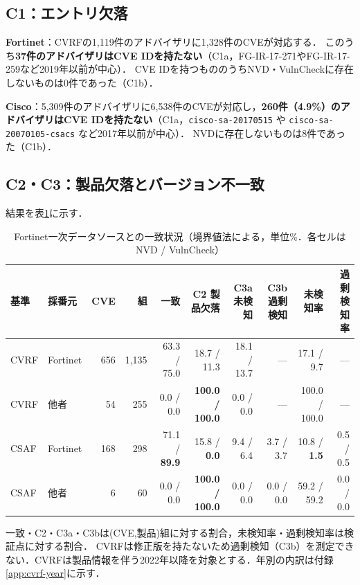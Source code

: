 \subsection{C1：エントリ欠落}

\textbf{Fortinet}：CVRFの1,119件のアドバイザリに1,328件のCVEが対応する．
このうち\textbf{37件のアドバイザリはCVE IDを持たない}（C1a，FG-IR-17-271やFG-IR-17-259など2019年以前が中心）．
CVE IDを持つもののうちNVD・VulnCheckに存在しないものは0件であった（C1b）．

\textbf{Cisco}：5,309件のアドバイザリに6,538件のCVEが対応し，\textbf{260件（4.9\%）のアドバイザリはCVE IDを持たない}（C1a，\texttt{cisco-sa-20170515} や \texttt{cisco-sa-20070105-csacs} など2017年以前が中心）．
NVDに存在しないものは8件であった（C1b）．

\subsection{C2・C3：製品欠落とバージョン不一致}

結果を表\ref{tab:match}に示す．

\begin{table}[htbp]
  \caption{Fortinet一次データソースとの一致状況（境界値法による，単位\%．各セルは NVD / VulnCheck）}
  \label{tab:match}
  \begin{center}
  \begin{tabular}{llrrrrrrrr}
    \hline
    基準 & 採番元 & CVE & 組 & 一致 & C2 製品欠落 & C3a 未検知 & C3b 過剰検知 & 未検知率 & 過剰検知率 \\
    \hline
    CVRF & Fortinet & 656 & 1,135 & 63.3 / 75.0 & 18.7 / 11.3 & 18.1 / 13.7 & --- & 17.1 / 9.7 & --- \\
    CVRF & 他者 & 54 & 255 & 0.0 / 0.0 & \textbf{100.0 / 100.0} & 0.0 / 0.0 & --- & 100.0 / 100.0 & --- \\
    CSAF & Fortinet & 168 & 298 & 71.1 / \textbf{89.9} & 15.8 / \textbf{0.0} & 9.4 / 6.4 & 3.7 / 3.7 & 10.8 / \textbf{1.5} & 0.5 / 0.5 \\
    CSAF & 他者 & 6 & 60 & 0.0 / 0.0 & \textbf{100.0 / 100.0} & 0.0 / 0.0 & 0.0 / 0.0 & 59.2 / 59.2 & 0.0 / 0.0 \\
    \hline
  \end{tabular}
  \end{center}
  \footnotesize
  一致・C2・C3a・C3bは(CVE,製品)組に対する割合，未検知率・過剰検知率は検証点に対する割合．
  CVRFは修正版を持たないため過剰検知（C3b）を測定できない．CVRFは製品情報を伴う2022年以降を対象とする．年別の内訳は付録\ref{app:cvrf-year}に示す．
\end{table}

